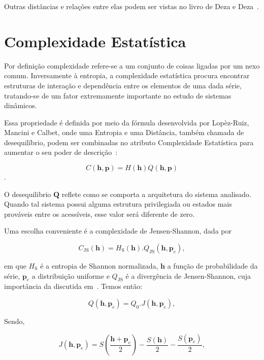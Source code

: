 Outras distâncias e relações entre elas podem ser vistas no livro de Deza e Deza~\citep{EncyclopediaofDistances}.

\section{Complexidade Estatística}

Por definição complexidade refere-se a um conjunto de coisas ligadas por um nexo comum. Inversamente à entropia, a complexidade estatística procura encontrar estruturas de interação e dependência entre os elementos de uma dada série, tratando-se de um fator extremamente importante no estudo de sistemas dinâmicos.

Essa propriedade é definida por meio da fórmula desenvolvida por Lopèz-Ruiz, Mancini e Calbet, onde uma Entropia e uma Distância, também chamada de desequilíbrio, podem ser combinadas no atributo Complexidade Estatística para aumentar o seu poder de descrição~\citep{article5,FELDMAN1998244,LOPEZRUIZ1995321}:

\begin{equation}
C(\bm h, \bm p) = H(\bm h)Q(\bm h, \bm p)
\end{equation}.

O desequilibrio $\bm Q$ reflete como se comporta a arquitetura do sistema analisado. Quando tal sistema possui alguma estrutura privilegiada ou estados mais prováveis entre os acessíveis, esse valor será diferente de zero.

Uma escolha conveniente é a complexidade de Jensen-Shannon, dada por

 \begin{equation}
 C_{\text{JS}}(\bm h) = H_{\text{S}}(\bm h) . Q_{\text{JS}}(\bm h, \bm p_e),
 \end{equation}
 
em que $H_{\text{S}}$ é a entropia de Shannon normalizada, $\bm h$ a função de probabilidade da série, $\bm p_e$ a distribuição uniforme e $Q_{\text{JS}}$ é a divergência de Jensen-Shannon, cuja importância da discutida em~\cite{LAMBERTI2004119}. Temos então:

\begin{equation}
Q(\bm h, \bm p_e) = Q_0 . J(\bm h, \bm p_e),
\end{equation}

Sendo,

\begin{equation}
J(\bm h, \bm p_e) = S\left(\frac{\bm h + \bm p_e}{2}\right) - \frac{S(\bm h)}{2} - \frac{S(\bm p_e)}{2},
\end{equation}

